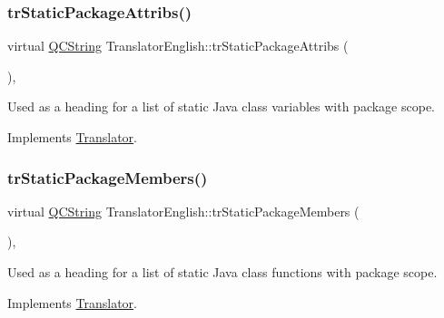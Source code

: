 \mbox{\label{class_translator_english_af6c68579e686da9e7dca855216a39dc7}} 
\subsubsection{\texorpdfstring{trStaticPackageAttribs()}{trStaticPackageAttribs()}}
{\footnotesize\ttfamily virtual \mbox{\hyperlink{class_q_c_string}{Q\+C\+String}} Translator\+English\+::tr\+Static\+Package\+Attribs (\begin{DoxyParamCaption}{ }\end{DoxyParamCaption})\hspace{0.3cm}{\ttfamily [inline]}, {\ttfamily [virtual]}}

Used as a heading for a list of static Java class variables with package scope. 

Implements \mbox{\hyperlink{class_translator}{Translator}}.

\mbox{\label{class_translator_english_a19f436877de296d10d25efdbc72038a3}} 
\subsubsection{\texorpdfstring{trStaticPackageMembers()}{trStaticPackageMembers()}}
{\footnotesize\ttfamily virtual \mbox{\hyperlink{class_q_c_string}{Q\+C\+String}} Translator\+English\+::tr\+Static\+Package\+Members (\begin{DoxyParamCaption}{ }\end{DoxyParamCaption})\hspace{0.3cm}{\ttfamily [inline]}, {\ttfamily [virtual]}}

Used as a heading for a list of static Java class functions with package scope. 

Implements \mbox{\hyperlink{class_translator}{Translator}}.

\mbox{\label{class_translator_english_a6a41819138e175f26a553ccf8069cec3}} 
